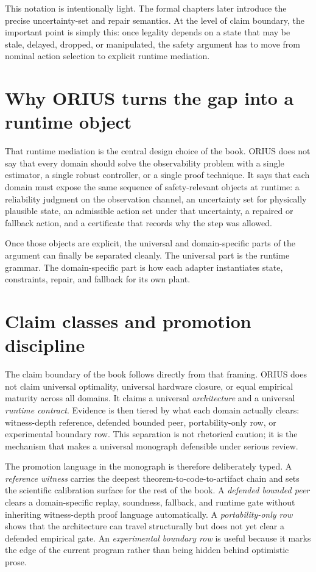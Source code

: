 This notation is intentionally light.  The formal chapters later introduce the precise
uncertainty-set and repair semantics.  At the level of claim boundary, the important
point is simply this: once legality depends on a state that may be stale, delayed,
dropped, or manipulated, the safety argument has to move from nominal action selection to
explicit runtime mediation.

\section{Why ORIUS turns the gap into a runtime object}
That runtime mediation is the central design choice of the book.  ORIUS does not say that
every domain should solve the observability problem with a single estimator, a single
robust controller, or a single proof technique.  It says that each domain must expose the
same sequence of safety-relevant objects at runtime: a reliability judgment on the
observation channel, an uncertainty set for physically plausible state, an admissible
action set under that uncertainty, a repaired or fallback action, and a certificate that
records why the step was allowed.

Once those objects are explicit, the universal and domain-specific parts of the argument
can finally be separated cleanly.  The universal part is the runtime grammar.  The
domain-specific part is how each adapter instantiates state, constraints, repair, and
fallback for its own plant.

\section{Claim classes and promotion discipline}
The claim boundary of the book follows directly from that framing.  ORIUS does not claim
universal optimality, universal hardware closure, or equal empirical maturity across all
domains.  It claims a universal \emph{architecture} and a universal \emph{runtime
contract}.  Evidence is then tiered by what each domain actually clears: witness-depth
reference, defended bounded peer, portability-only row, or experimental boundary row.
This separation is not rhetorical caution; it is the mechanism that
makes a universal monograph defensible under serious review.

The promotion language in the monograph is therefore deliberately typed.  A
\emph{reference witness} carries the deepest theorem-to-code-to-artifact chain and sets
the scientific calibration surface for the rest of the book.  A \emph{defended bounded
peer} clears a domain-specific replay, soundness, fallback, and runtime gate without
inheriting witness-depth proof language automatically.  A \emph{portability-only row}
shows that the architecture can travel structurally but does not yet clear a defended
empirical gate.  An \emph{experimental boundary row} is useful because it marks the edge
of the current program rather than being hidden behind optimistic prose.

